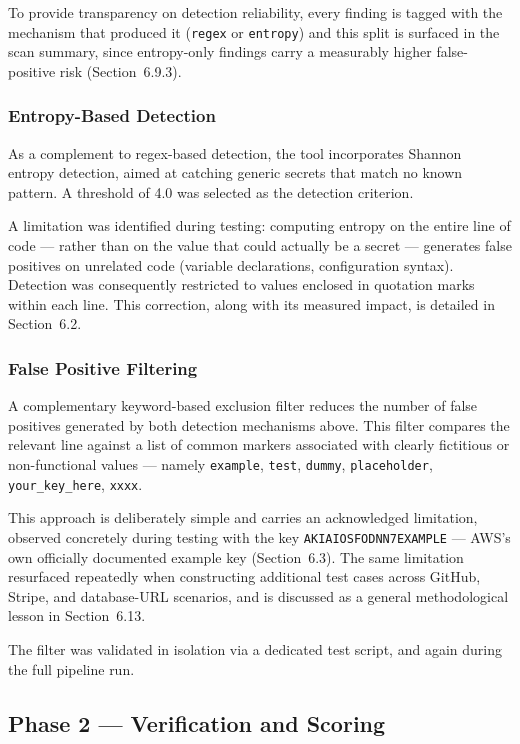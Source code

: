 \documentclass[12pt]{article}
\begin{document}
To provide transparency on detection reliability, every finding is tagged with the mechanism that produced it (\texttt{regex} or \texttt{entropy}) and this split is surfaced in the scan summary, since entropy-only findings carry a measurably higher false-positive risk (Section~6.9.3).

\subsubsection{Entropy-Based Detection}

As a complement to regex-based detection, the tool incorporates Shannon entropy detection, aimed at catching generic secrets that match no known pattern. A threshold of 4.0 was selected as the detection criterion.

A limitation was identified during testing: computing entropy on the entire line of code --- rather than on the value that could actually be a secret --- generates false positives on unrelated code (variable declarations, configuration syntax). Detection was consequently restricted to values enclosed in quotation marks within each line. This correction, along with its measured impact, is detailed in Section~6.2.

\subsubsection{False Positive Filtering}

A complementary keyword-based exclusion filter reduces the number of false positives generated by both detection mechanisms above. This filter compares the relevant line against a list of common markers associated with clearly fictitious or non-functional values --- namely \texttt{example}, \texttt{test}, \texttt{dummy}, \texttt{placeholder}, \texttt{your\_key\_here}, \texttt{xxxx}.

This approach is deliberately simple and carries an acknowledged limitation, observed concretely during testing with the key \texttt{AKIAIOSFODNN7EXAMPLE} --- AWS's own officially documented example key (Section~6.3). The same limitation resurfaced repeatedly when constructing additional test cases across GitHub, Stripe, and database-URL scenarios, and is discussed as a general methodological lesson in Section~6.13.

The filter was validated in isolation via a dedicated test script, and again during the full pipeline run.

\subsection{Phase 2 --- Verification and Scoring}
\end{document}
